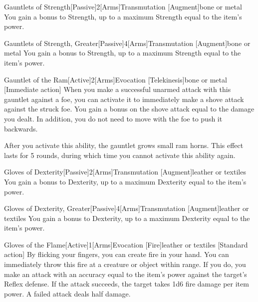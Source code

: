         \begin{magicitemdef}{Gauntlets of Strength}[Passive]{2}[Arms]{Transmutation [Augment]}{bone or metal}
             You gain a  bonus to Strength, up to a maximum Strength equal to the item's power.
        \end{magicitemdef}

        \begin{magicitemdef}{Gauntlets of Strength, Greater}[Passive]{4}[Arms]{Transmutation [Augment]}{bone or metal}
             You gain a  bonus to Strength, up to a maximum Strength equal to the item's power.
        \end{magicitemdef}

        \begin{magicitemdef}{Gauntlet of the Ram}[Active]{2}[Arms]{Evocation [Telekinesis]}{bone or metal}
            [Immediate action] When you make a successful unarmed attack with this gauntlet against a foe, you can activate it to immediately make a shove attack against the struck foe.
            You gain a bonus on the shove attack equal to the damage you dealt.
            In addition, you do not need to move with the foe to push it backwards.

            After you activate this ability, the gauntlet grows small ram horns.
            This effect lasts for 5 rounds, during which time you cannot activate this ability again.
        \end{magicitemdef}

        \begin{magicitemdef}{Gloves of Dexterity}[Passive]{2}[Arms]{Transmutation [Augment]}{leather or textiles}
             You gain a  bonus to Dexterity, up to a maximum Dexterity equal to the item's power.
        \end{magicitemdef}

        \begin{magicitemdef}{Gloves of Dexterity, Greater}[Passive]{4}[Arms]{Transmutation [Augment]}{leather or textiles}
             You gain a  bonus to Dexterity, up to a maximum Dexterity equal to the item's power.
        \end{magicitemdef}

        \begin{magicitemdef}{Gloves of the Flame}[Active]{1}[Arms]{Evocation [Fire]}{leather or textiles}
            [Standard action] By flicking your fingers, you can create fire in your hand.
            You can immediately throw this fire at a creature or object within \rngclose range.
            If you do, you make an attack with an accuracy equal to the item's power against the target's Reflex defense.
            If the attack succeeds, the target takes 1d6 fire damage per item power.
            A failed attack deals half damage.
        \end{magicitemdef}

